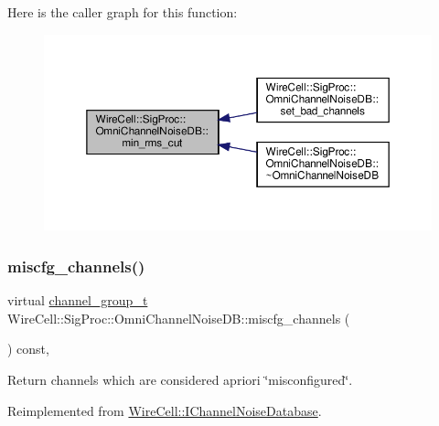 Here is the caller graph for this function\+:
\nopagebreak
\begin{figure}[H]
\begin{center}
\leavevmode
\includegraphics[width=350pt]{class_wire_cell_1_1_sig_proc_1_1_omni_channel_noise_d_b_a37f1dda111792a36315f977c2ade5783_icgraph}
\end{center}
\end{figure}
\mbox{\label{class_wire_cell_1_1_sig_proc_1_1_omni_channel_noise_d_b_a32b0db5811fe2d33ec566c31283800fa}} 
\subsubsection{\texorpdfstring{miscfg\+\_\+channels()}{miscfg\_channels()}}
{\footnotesize\ttfamily virtual \hyperlink{class_wire_cell_1_1_i_channel_noise_database_a7fedd6ab67ba4e7eeb8cf182cc9dc6b1}{channel\+\_\+group\+\_\+t} Wire\+Cell\+::\+Sig\+Proc\+::\+Omni\+Channel\+Noise\+D\+B\+::miscfg\+\_\+channels (\begin{DoxyParamCaption}{ }\end{DoxyParamCaption}) const\hspace{0.3cm}{\ttfamily [inline]}, {\ttfamily [virtual]}}



Return channels which are considered a\textquotesingle{}priori \char`\"{}misconfigured\char`\"{}. 



Reimplemented from \hyperlink{class_wire_cell_1_1_i_channel_noise_database_ad653c3c17b0524eca95fa4ce8574ffe9}{Wire\+Cell\+::\+I\+Channel\+Noise\+Database}.




